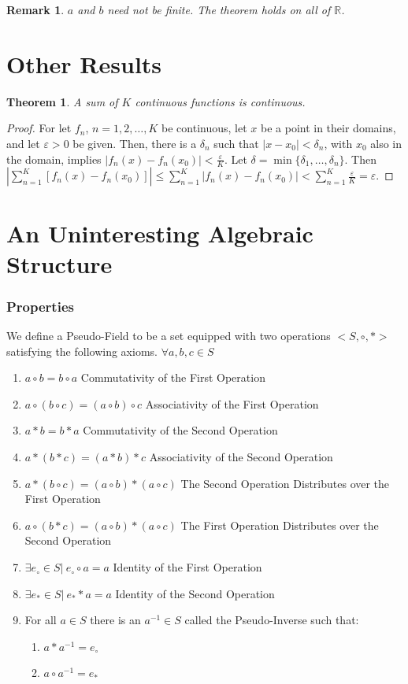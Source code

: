 \documentclass[12pt,oneside]{book}
\theoremstyle{mystyle}
\newtheorem{theorem}{Theorem}[section]
\newtheorem{remark}{Remark}[section]
\begin{document}
\begin{remark}
$a$ and $b$ need not be finite. The theorem holds on all of $\mathbb{R}$. 
\end{remark}
%
\section{Other Results}
%
\begin{theorem}
A sum of $K$ continuous functions is continuous. 
\end{theorem}
\begin{proof}
For let $f_n$, $n=1,2,\hdots,K$ be continuous, let $x$ be a point in their domains, and let $\varepsilon>0$ be given. Then, there is a $\delta_n$ such that $|x-x_0|<\delta_n$, with $x_0$ also in the domain, implies $|f_n(x)-f_n(x_0)|<\frac{\varepsilon}{K}$. Let $\delta = \min\{\delta_1,\hdots,\delta_n\}$. Then $|\sum_{n=1}^{K}[f_n(x)-f_n(x_0)]| \leq \sum_{n=1}^{K}|f_n(x)-f_n(x_0)| < \sum_{n=1}^{K} \frac{\varepsilon}{K} = \varepsilon$.
\end{proof}
%
\section{An Uninteresting Algebraic Structure}
%
\subsubsection{Properties}
\noindent We define a Pseudo-Field to be a set equipped with two operations $<S,\circ, *>$ satisfying the following axioms.
$\forall a,b,c \in S$
\begin{enumerate}
\item $a\circ b = b\circ a$ \hfill Commutativity of the First Operation
\item $a\circ (b\circ c)=(a \circ b)\circ c$ \hfill Associativity of the First Operation
\item $a*b = b*a$ \hfill Commutativity of the Second Operation
\item $a*(b*c) = (a*b)*c$ \hfill Associativity of the Second Operation
\item $a*(b\circ c)=(a\circ b)*(a\circ c)$ \hfill The Second Operation Distributes over the First Operation
\item $a\circ (b*c) = (a\circ b)*(a\circ c)$ \hfill The First Operation Distributes over the Second Operation
\item $\exists e_{\circ}\in S|\ e_{\circ}\circ a = a$ \hfill Identity of the First Operation
\item $\exists e_{*} \in S|\ e_{*}*a = a$ \hfill Identity of the Second Operation
\item For all $a\in S$ there is an $a^{-1}\in S$ called the Pseudo-Inverse such that:
\begin{enumerate}
\item $a*a^{-1} = e_{\circ}$
\item $a\circ a^{-1}=e_{*}$
\end{enumerate}
\end{enumerate}
\end{document}
